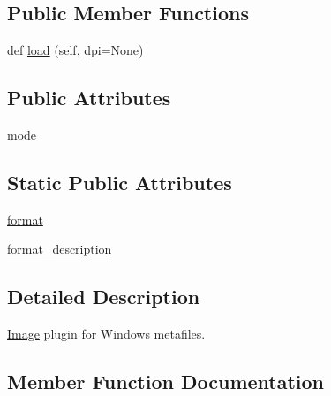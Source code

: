 \subsection*{Public Member Functions}
\begin{DoxyCompactItemize}
\item 
def \hyperlink{classPIL_1_1WmfImagePlugin_1_1WmfStubImageFile_afbfbb8cafa798d414f2fe1421e0e288a}{load} (self, dpi=None)
\end{DoxyCompactItemize}
\subsection*{Public Attributes}
\begin{DoxyCompactItemize}
\item 
\hyperlink{classPIL_1_1WmfImagePlugin_1_1WmfStubImageFile_ab38ff931cc979d5187bb0d1a9e19b0dc}{mode}
\end{DoxyCompactItemize}
\subsection*{Static Public Attributes}
\begin{DoxyCompactItemize}
\item 
\hyperlink{classPIL_1_1WmfImagePlugin_1_1WmfStubImageFile_adb81165b5ff41d306b3f1609f46bdc2c}{format}
\item 
\hyperlink{classPIL_1_1WmfImagePlugin_1_1WmfStubImageFile_a4feef853ed7e998f03e48f756c20331a}{format\+\_\+description}
\end{DoxyCompactItemize}


\subsection{Detailed Description}
\hyperlink{namespacePIL_1_1Image}{Image} plugin for Windows metafiles. 



\subsection{Member Function Documentation}
\mbox{\label{classPIL_1_1WmfImagePlugin_1_1WmfStubImageFile_afbfbb8cafa798d414f2fe1421e0e288a}} 
